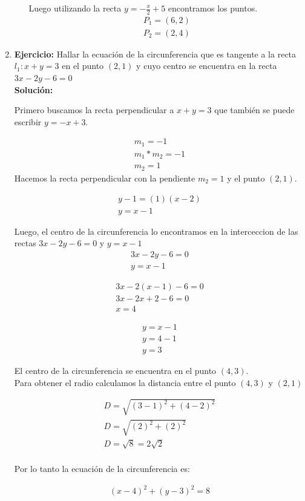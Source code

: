 \documentclass[a4paper,10pt]{article}
\begin{document}
\begin{enumerate}
\begin{enumerate}
Luego utilizando la recta $y= -\frac{x}{2}+5$ encontramos los puntos.
\begin{align*}
P_1 = (6,2)\\ 
P_2=(2,4)
\end{align*}
\end{enumerate}

\newpage

\item \textbf{Ejercicio:} Hallar la ecuación de la circunferencia que es tangente a la recta $l_1:x+y=3$ en el punto $(2,1)$ y cuyo centro se encuentra en la recta $3x-2y-6=0$\\

\textbf{Solución:}

Primero buscamos la recta perpendicular a $x+y=3$ que también se puede escribir $y=-x+3$.

\begin{gather*}
m_1 = -1\\
m_1 * m_2= -1\\
m_2 = 1
\end{gather*}
Hacemos la recta perpendicular con la pendiente $m_2= 1$ y el punto $(2,1)$.

\begin{gather*}
y-1= (1)(x-2)\\
y=x-1
\end{gather*}

Luego, el centro de la circunferencia lo encontramos en la interceccion de las rectas $3x-2y-6=0$ y $y=x-1$
\begin{gather*}
3x-2y-6=0\\
y=x-1
\end{gather*}

\begin{gather*}
3x-2(x-1)-6=0\\
3x-2x+2-6=0\\
x=4
\end{gather*}

\begin{gather*}
y=x-1\\
y=4-1\\
y=3
\end{gather*}

El centro de la circunferencia se encuentra en el punto $(4,3)$.\\

Para obtener el radio calculamos la distancia entre el punto $(4,3)$ y $(2,1)$

\begin{gather*}
D= \sqrt{(3-1)^2+(4-2)^2}\\
D= \sqrt{(2)^2+(2)^2}\\
D= \sqrt{8} = 2\sqrt{2}\\
\end{gather*}

Por lo tanto la ecuación de la circunferencia es:

\begin{gather*}
(x-4)^2+(y-3)^2=8
\end{gather*}


 \end{enumerate}
\end{document}
